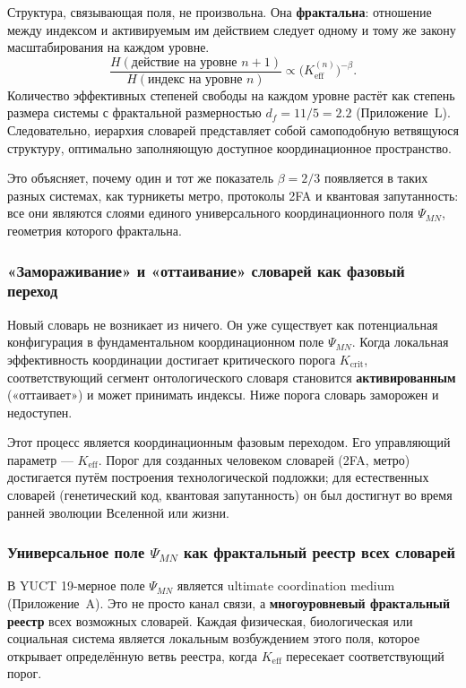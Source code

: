 \documentclass[12pt,a4paper]{article}
\theoremstyle{remark}
\begin{document}
	Структура, связывающая поля, не произвольна. Она \textbf{фрактальна}: отношение между индексом и активируемым им действием следует одному и тому же закону масштабирования на каждом уровне.
	\[
	\frac{H(\text{действие на уровне } n+1)}{H(\text{индекс на уровне } n)}
	\propto \bigl(K_{\mathrm{eff}}^{(n)}\bigr)^{-\beta}.
	\]
	Количество эффективных степеней свободы на каждом уровне растёт как степень размера системы с фрактальной размерностью $d_f = 11/5 = 2.2$ (Приложение~L). Следовательно, иерархия словарей представляет собой самоподобную ветвящуюся структуру, оптимально заполняющую доступное координационное пространство.
	
	Это объясняет, почему один и тот же показатель $\beta=2/3$ появляется в таких разных системах, как турникеты метро, протоколы 2FA и квантовая запутанность: все они являются слоями единого универсального координационного поля $\Psi_{MN}$, геометрия которого фрактальна.
	
	\subsubsection{«Замораживание» и «оттаивание» словарей как фазовый переход}
	
	Новый словарь не возникает из ничего. Он уже существует как потенциальная конфигурация в фундаментальном координационном поле $\Psi_{MN}$. Когда локальная эффективность координации достигает критического порога $K_{\mathrm{crit}}$, соответствующий сегмент онтологического словаря становится \textbf{активированным} («оттаивает») и может принимать индексы. Ниже порога словарь заморожен и недоступен.
	
	Этот процесс является координационным фазовым переходом. Его управляющий параметр — $K_{\mathrm{eff}}$. Порог для созданных человеком словарей (2FA, метро) достигается путём построения технологической подложки; для естественных словарей (генетический код, квантовая запутанность) он был достигнут во время ранней эволюции Вселенной или жизни.
	
	\subsubsection{Универсальное поле \(\Psi_{MN}\) как фрактальный реестр всех словарей}
	
	В YUCT 19-мерное поле $\Psi_{MN}$ является ultimate coordination medium (Приложение~A). Это не просто канал связи, а \textbf{многоуровневый фрактальный реестр} всех возможных словарей. Каждая физическая, биологическая или социальная система является локальным возбуждением этого поля, которое открывает определённую ветвь реестра, когда $K_{\mathrm{eff}}$ пересекает соответствующий порог.
	
\end{document}
